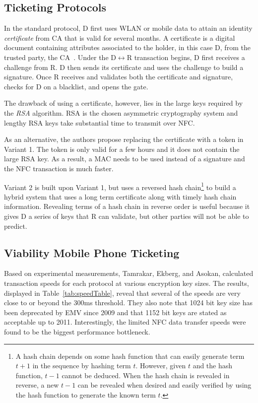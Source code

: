\documentclass{sig-alternate}
\begin{document}
\subsection{Ticketing Protocols}
In the standard protocol, D first uses WLAN or mobile data to attain an identity \textit{certificate} from CA that is valid for several months. A certificate is a digital document containing attributes associated to the holder, in this case D, from the trusted party, the CA~\cite{crypto}. Under the D$\leftrightarrow$R transaction begins, D first receives a challenge from R.  D then sends its certificate and uses the challenge to build a signature. Once R receives and validates both the certificate and signature, checks for D on a blacklist, and opens the gate.

The drawback of using a certificate, however, lies in the large keys required by the \textit{RSA} algorithm. RSA is the chosen asymmetric cryptography system and lengthy RSA keys take substantial time to transmit over NFC.

As an alternative, the authors propose replacing the certificate with a token in Variant 1. The token is only valid for a few hours and it does not contain the large RSA key. As a result, a MAC needs to be used instead of a signature and the NFC transaction is much faster.

Variant 2 is built upon Variant 1, but uses a reversed hash chain\footnote{
A hash chain depends on some hash function that can easily generate term $t+1$ in the sequence by hashing term $t$. However, given $t$ and the hash function, $t-1$ cannot be deduced. When the hash chain is revealed in reverse, a new $t-1$ can be revealed when desired and easily verified by using the hash function to generate the known term $t$.
} to build a hybrid system that uses a long term certificate along with timely hash chain information. Revealing terms of a hash chain in reverse order is useful because it gives D a series of keys that R can validate, but other parties will not be able to predict.

\subsection{Viability Mobile Phone Ticketing}
Based on experimental measurements, Tamrakar, Ekberg, and Asokan, calculated transaction speeds for each protocol at various encryption key sizes. The results, displayed in Table~\ref{tab:speedTable}, reveal that several of the speeds are very close to or beyond the 300ms threshold. They also note that 1024 bit key size has been deprecated by EMV since 2009 and that 1152 bit keys are stated as acceptable up to 2011. Interestingly, the limited NFC data transfer speeds were found to be the biggest performance bottleneck.
\end{document}
